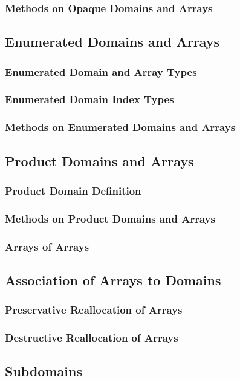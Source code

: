 \documentclass[10pt,twoside,titlepage]{article}
\begin{document}
\subsubsection{Methods on Opaque Domains and Arrays}
\subsection{Enumerated Domains and Arrays}
\subsubsection{Enumerated Domain and Array Types}
\subsubsection{Enumerated Domain Index Types}
\subsubsection{Methods on Enumerated Domains and Arrays}
\subsection{Product Domains and Arrays}
\subsubsection{Product Domain Definition}
\subsubsection{Methods on Product Domains and Arrays}
\subsubsection{Arrays of Arrays}
\subsection{Association of Arrays to Domains}
\subsubsection{Preservative Reallocation of Arrays}
\subsubsection{Destructive Reallocation of Arrays}
\subsection{Subdomains}
\end{document}
